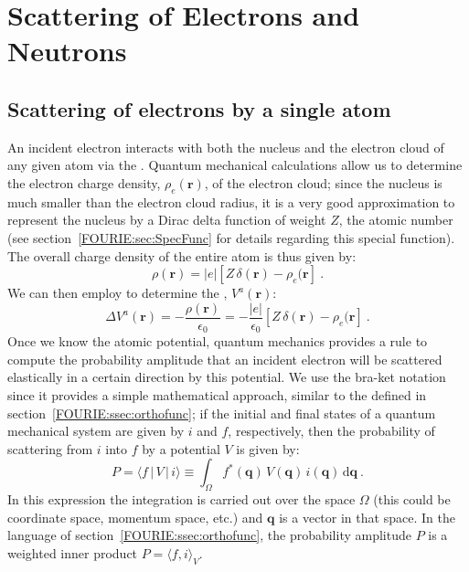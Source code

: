 \section{Scattering of Electrons and Neutrons}\label{\chabbr:sec:elecneutron}

\subsection{Scattering of electrons by a single atom}\label{\chabbr:ssec:singleelectron}
An incident electron interacts with both the nucleus and the electron cloud of any given atom via the .  Quantum mechanical calculations allow us to determine the electron charge density, $\rho_e(\mathbf{r})$, of the electron cloud; since the nucleus is much smaller than the electron cloud radius, it is a very good approximation to represent the nucleus by a Dirac delta function of weight $Z$, the atomic number (see section~\ref{FOURIE:sec:SpecFunc} for details regarding this special function).  The overall charge density of the entire atom is thus given by:
\begin{equation}
	\rho(\mathbf{r}) = \vert e\vert [Z\,\delta(\mathbf{r}) - \rho_e(\mathbf{r}]\ .\label{\chabbr:eq:chargedensity}
\end{equation}
We can then employ  to determine the , $V^a(\mathbf{r})$:
\begin{equation}
	\Delta V^a(\mathbf{r}) = -\frac{\rho(\mathbf{r})}{\epsilon_0} = -\frac{\vert e\vert}{\epsilon_0} [Z\,\delta(\mathbf{r}) - \rho_e(\mathbf{r}]\ .\label{\chabbr:eq:electroV}
\end{equation}
Once we know the atomic potential, quantum mechanics provides a rule to compute the probability amplitude that an incident electron will be scattered elastically in a certain direction by this potential. We use the bra-ket notation since it provides a simple mathematical approach, similar to the  defined in section~\ref{FOURIE:ssec:orthofunc}; if the initial and final states of a quantum mechanical system are given by $i$ and $f$, respectively, then the probability of scattering from $i$ into $f$ by a potential $V$ is given by:
\[
	P = \langle f\,\vert\, V\,\vert\, i\rangle \equiv \int_\Omega f^{\ast}(\mathbf{q})\,V(\mathbf{q})\, i(\mathbf{q})\, \mathrm{d}\mathbf{q}\ .
\]
In this expression the integration is carried out over the space $\Omega$ (this could be coordinate space, momentum space, etc.) and $\mathbf{q}$ is a vector in that space.  In the language of section~\ref{FOURIE:ssec:orthofunc}, the probability amplitude $P$ is a weighted inner product $P=\langle f, i\rangle_{V}$.


